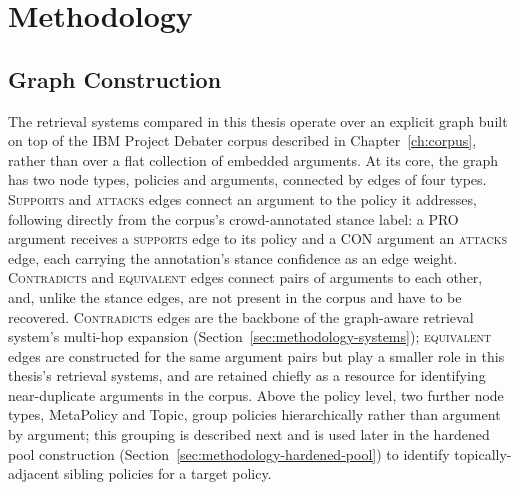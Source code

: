 \chapter{Methodology}
\label{ch:methodology}

\section{Graph Construction}
\label{sec:methodology-graph}

The retrieval systems compared in this thesis operate over an explicit graph built on top of the
IBM Project Debater corpus described in Chapter~\ref{ch:corpus}, rather than over a flat
collection of embedded arguments. At its core, the graph has two node types, policies and
arguments, connected by edges of four types. \textsc{Supports} and \textsc{attacks} edges connect
an argument to the policy it addresses, following directly from the corpus's crowd-annotated
stance label: a PRO argument receives a \textsc{supports} edge to its policy and a CON argument an
\textsc{attacks} edge, each carrying the annotation's stance confidence as an edge weight.
\textsc{Contradicts} and \textsc{equivalent} edges connect pairs of arguments to each other, and,
unlike the stance edges, are not present in the corpus and have to be recovered.
\textsc{Contradicts} edges are the backbone of the graph-aware retrieval system's multi-hop
expansion (Section~\ref{sec:methodology-systems}); \textsc{equivalent} edges are constructed for
the same argument pairs but play a smaller role in this thesis's retrieval systems, and are
retained chiefly as a resource for identifying near-duplicate arguments in the corpus. Above the
policy level, two further node types, MetaPolicy and Topic, group policies hierarchically rather
than argument by argument; this grouping is described next and is used later in the hardened pool
construction (Section~\ref{sec:methodology-hardened-pool}) to identify topically-adjacent sibling
policies for a target policy.


